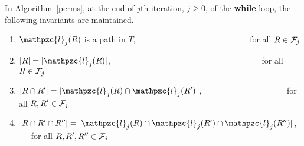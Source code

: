 \documentclass[envcountsect, envcountsame, 11pt]{../lib/llncs2e/llncs}
\def\cF{{\cal F}}
\def\cl{\mathpzc{l}}
\def\topshrink{0mm} %
\begin{document}
\begin{lemma}
  \label{lem:invar1} In Algorithm~\ref{perms}, at the end of $j$th
  iteration, $j \ge 0$, of the {\bf while} loop, the following
  invariants are maintained.
  \begin{enumerate}[I {\ }] %
  \item $\cl_j(R)$ is a path in $T$, \ \ \ \ \ \ \ \ \ \ \ \ \ \ \ \ \
    \ \ \ \ \ \ \ \ \ \ for all $R \in \cF_j$%
  \item $|R| = |\cl_j(R)|$, \ \ \ \ \ \ \ \ \ \ \ \ \ \ \ \ \ \ \ \ \
    \ \ \ \ \ \ \ \ \ \ \ \ \ \ \ for all $R \in
    \cF_j$%
  \item $|R \cap R'| = |\cl_j(R) \cap \cl_j(R')|$, \ \ \ \ \ \ \ \ \ \
    \ \ \ \ \ \ \ \ \ \ for all $R, R' \in \cF_j$%
  \item $|R \cap R' \cap R''|=|\cl_j(R) \cap \cl_j(R') \cap
    \cl_j(R'')|$, \ \ \ for all $R, R', R'' \in \cF_j$
  \end{enumerate}
\end{lemma}
\end{document}
